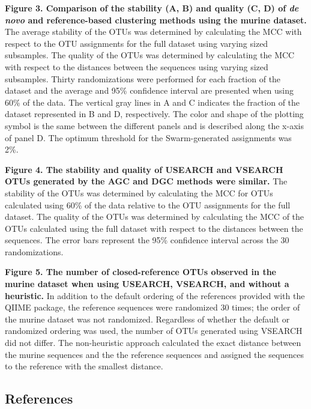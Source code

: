 \documentclass[11pt,]{article}
\begin{document}
\textbf{Figure 3. Comparison of the stability (A, B) and quality (C, D)
of \emph{de novo} and reference-based clustering methods using the
murine dataset.} The average stability of the OTUs was determined by
calculating the MCC with respect to the OTU assignments for the full
dataset using varying sized subsamples. The quality of the OTUs was
determined by calculating the MCC with respect to the distances between
the sequences using varying sized subsamples. Thirty randomizations were
performed for each fraction of the dataset and the average and 95\%
confidence interval are presented when using 60\% of the data. The
vertical gray lines in A and C indicates the fraction of the dataset
represented in B and D, respectively. The color and shape of the
plotting symbol is the same between the different panels and is
described along the x-axis of panel D. The optimum threshold for the
Swarm-generated assignments was 2\%.

\textbf{Figure 4. The stability and quality of USEARCH and VSEARCH OTUs
generated by the AGC and DGC methods were similar.} The stability of the
OTUs was determined by calculating the MCC for OTUs calculated using
60\% of the data relative to the OTU assignments for the full dataset.
The quality of the OTUs was determined by calculating the MCC of the
OTUs calculated using the full dataset with respect to the distances
between the sequences. The error bars represent the 95\% confidence
interval across the 30 randomizations.

\textbf{Figure 5. The number of closed-reference OTUs observed in the
murine dataset when using USEARCH, VSEARCH, and without a heuristic.} In
addition to the default ordering of the references provided with the
QIIME package, the reference sequences were randomized 30 times; the
order of the murine dataset was not randomized. Regardless of whether
the default or randomized ordering was used, the number of OTUs
generated using VSEARCH did not differ. The non-heuristic approach
calculated the exact distance between the murine sequences and the the
reference sequences and assigned the sequences to the reference with the
smallest distance.

\newpage






\newpage

\subsection*{References}\label{references}
\end{document}

